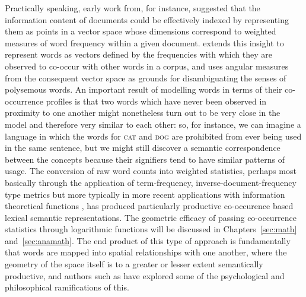 Practically speaking, early work from, for instance, \cite{SaltonEA1975} suggested that the information content of documents could be effectively indexed by representing them as points in a vector space whose dimensions correspond to weighted measures of word frequency within a given document.  \cite{Schutze1992} extends this insight to represent words as vectors defined by the frequencies with which they are observed to co-occur with other words in a corpus, and uses angular measures from the consequent vector space as grounds for disambiguating the senses of polysemous words.  An important result of modelling words in terms of their co-occurrence profiles is that two words which have never been observed in proximity to one another might nonetheless turn out to be very close in the model and therefore very similar to each other: so, for instance, we can imagine a language in which the words for \textsc{cat} and \textsc{dog} are prohibited from ever being used in the same sentence, but we might still discover a semantic correspondence between the concepts because their signifiers tend to have similar patterns of usage.  The conversion of raw word counts into weighted statistics, perhaps most basically through the application of term-frequency, inverse-document-frequency type metrics \citep{SaltonEA1988} but more typically in more recent applications with information theoretical functions \citep{Turney2001}, has produced particularly productive co-occurence based lexical semantic representations.  The geometric efficacy of passing co-occurrence statistics through logarithmic functions will be discussed in Chapters~\ref{sec:math} and~\ref{sec:anamath}.  The end product of this type of approach is fundamentally that words are mapped into spatial relationships with one another, where the geometry of the space itself is to a greater or lesser extent semantically productive, and authors such as \cite{LandauerEA1997b} have explored some of the psychological and philosophical ramifications of this.

